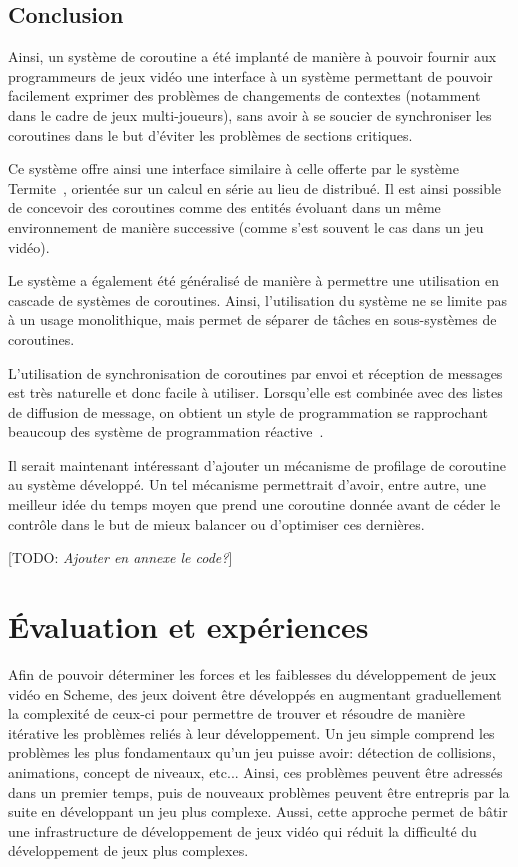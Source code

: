 \documentclass[12pt,oneside,letterpaper,francais]{book}
\newcommand{\todo}[1]{[TODO: {\it #1}]}
\begin{document}
\section{Conclusion}

Ainsi, un système de coroutine a été implanté de manière à pouvoir
fournir aux programmeurs de jeux vidéo une interface à un système
permettant de pouvoir facilement exprimer des problèmes de changements
de contextes (notamment dans le cadre de jeux multi-joueurs), sans
avoir à se soucier de synchroniser les coroutines dans le but d'éviter
les problèmes de sections critiques.

Ce système offre ainsi une interface similaire à celle offerte par le
système Termite~\cite{Termite_paper}, orientée sur un calcul en série
au lieu de distribué. Il est ainsi possible de concevoir des
coroutines comme des entités évoluant dans un même environnement de
manière successive (comme s'est souvent le cas dans un jeu vidéo).

Le système a également été généralisé de manière à permettre une
utilisation en cascade de systèmes de coroutines. Ainsi, l'utilisation
du système ne se limite pas à un usage monolithique, mais permet de
séparer de tâches en sous-systèmes de coroutines.

L'utilisation de synchronisation de coroutines par envoi et réception
de messages est très naturelle et donc facile à utiliser. Lorsqu'elle
est combinée avec des listes de diffusion de message, on obtient un
style de programmation se rapprochant beaucoup des système de
programmation réactive~\cite{FRP}.

Il serait maintenant intéressant d'ajouter un mécanisme de profilage
de coroutine au système développé. Un tel mécanisme permettrait
d'avoir, entre autre, une meilleur idée du temps moyen que prend une
coroutine donnée avant de céder le contrôle dans le but de mieux
balancer ou d'optimiser ces dernières.

\todo{Ajouter en annexe le code?}


\chapter{Évaluation et expériences}
\label{Chap:exp}

Afin de pouvoir déterminer les forces et les faiblesses du
développement de jeux vidéo en Scheme, des jeux doivent être
développés en augmentant graduellement la complexité de ceux-ci pour
permettre de trouver et résoudre de manière itérative les problèmes
reliés à leur développement. Un jeu simple comprend les problèmes les
plus fondamentaux qu'un jeu puisse avoir: détection de collisions,
animations, concept de niveaux, etc... Ainsi, ces problèmes peuvent
être adressés dans un premier temps, puis de nouveaux problèmes
peuvent être entrepris par la suite en développant un jeu plus
complexe. Aussi, cette approche permet de bâtir une infrastructure de
développement de jeux vidéo qui réduit la difficulté du développement
de jeux plus complexes.
\end{document}
